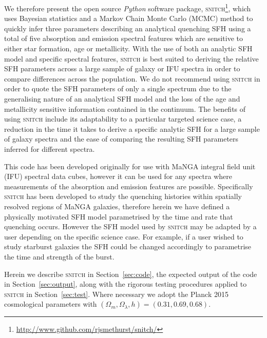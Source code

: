 \documentclass[useAMS,usenatbib]{mn2e}
\def\referee		{\color{refer}}
\begin{document}
We therefore present the open source \emph{Python} software package, \textsc{snitch}\footnote{\url{http://www.github.com/rjsmethurst/snitch/}}, which uses Bayesian statistics and a Markov Chain Monte Carlo (MCMC) method to quickly infer three parameters describing an analytical quenching SFH using a total of five absorption and emission spectral features which are sensitive to either star formation, age or metallicity. {\referee With the use of both an analytic SFH model and specific spectral features}, \textsc{snitch} is best suited to deriving the relative SFH parameters across a large sample of galaxy or IFU spectra in order to compare differences across the population. We do not recommend using \textsc{snitch} in order to quote the SFH parameters of only a single spectrum due to the generalising nature of an analytical SFH model {\referee and the loss of the age and metallicity sensitive information contained in the continuum.}  The benefits of using \textsc{snitch} include its adaptability to a particular targeted science case, a reduction in the time it takes to derive a specific analytic SFH for a large sample of galaxy spectra and the ease of comparing the resulting SFH parameters inferred for different spectra. 

This code has been developed originally for use with MaNGA integral field unit (IFU) spectral data cubes, however it can be used for any spectra where measurements of the absorption and emission features are possible. Specifically \textsc{snitch} has been developed to study the quenching histories within spatially resolved regions of MaNGA galaxies, therefore herein we have defined a physically motivated SFH model parametrised by the time and rate that quenching occurs. However the SFH model used by \textsc{snitch} may be adapted by a user depending on the specific science case. For example, if a user wished to study starburst galaxies the SFH could be changed accordingly to parametrise the time and strength of the burst. 


Herein we describe \textsc{snitch} in Section~\ref{sec:code}, the expected output of the code in Section~\ref{sec:output}, along with the rigorous testing procedures applied to \textsc{snitch} in Section~\ref{sec:test}. Where necessary we adopt the Planck 2015 \citep{planck16} cosmological parameters with $(\Omega_m, \Omega_{\lambda}, h) = (0.31, 0.69, 0.68)$. 
\end{document}
